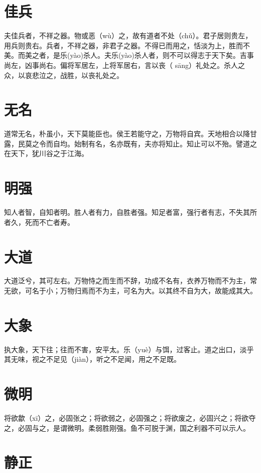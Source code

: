 \documentclass[a4paper,12pt,UTF8,twoside]{ctexbook}
\begin{document}
	
	\chapter{佳兵}
	夫佳兵者，不祥之器。物或恶（wù）之，故有道者不处（chǔ）。君子居则贵左，用兵则贵右。兵者，不祥之器，非君子之器。不得已而用之，恬淡为上，胜而不美。而美之者，是乐(yào)杀人。夫乐(yào)杀人者，则不可以得志于天下矣。吉事尚左，凶事尚右。偏将军居左，上将军居右，言以丧（	sāng）礼处之。杀人之众，以哀悲泣之，战胜，以丧礼处之。	
	
	
	
	\chapter{无名}
	道常无名，朴虽小，天下莫能臣也。侯王若能守之，万物将自宾。天地相合以降甘露，民莫之令而自均。始制有名，名亦既有，夫亦将知止。知止可以不殆。譬道之在天下，犹川谷之于江海。
	
	
	
	\chapter{明强}
	
	知人者智，自知者明。胜人者有力，自胜者强。知足者富，强行者有志，不失其所者久，死而不亡者寿。
	
	
	
	\chapter{大道}
	
	大道泛兮，其可左右。万物恃之而生而不辞，功成不名有，衣养万物而不为主，常无欲，可名于小；万物归焉而不为主，可名为大。以其终不自为大，故能成其大。	
	
	
	\chapter{大象}
	执大象，天下往；往而不害，安平太。乐（yuè）与饵，过客止。道之出口，淡乎其无味，视之不足见（jiàn），听之不足闻，用之不足既。
	
	
	
	
	\chapter{微明}
	将欲歙（xī）之，必固张之；将欲弱之，必固强之；将欲废之，必固兴之；将欲夺之，必固与之，是谓微明。柔弱胜刚强。鱼不可脱于渊，国之利器不可以示人。
	
	\chapter{静正}
	
\end{document}
